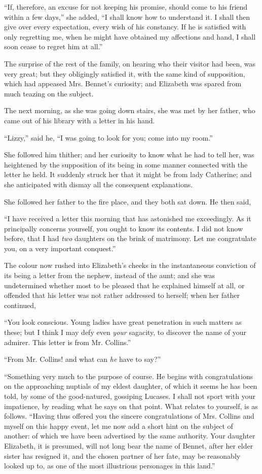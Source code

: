“If, therefore, an excuse for not keeping his promise,
should come to his friend within a few days,” she added,
“I shall know how to understand it. I shall then give
over every expectation, every wish of his constancy. If
he is satisfied with only regretting me, when he might
have obtained my affections and hand, I shall soon cease
to regret him at all.”

\strut

The surprise of the rest of the family, on hearing who
their visitor had been, was very great; but they obligingly
satisfied it, with the same kind of supposition, which had
appeased Mrs. Bennet’s curiosity; and Elizabeth was
spared from much teazing on the subject.

The next morning, as she was going down stairs, she
was met by her father, who came out of his library with
a letter in his hand.

“Lizzy,” said he, “I was going to look for you; come
into my room.”

She followed him thither; and her curiosity to know
what he had to tell her, was heightened by the supposition
of its being in some manner connected with the letter he
held. It suddenly struck her that it might be from lady
Catherine; and she anticipated with dismay all the
consequent explanations.

She followed her father to the fire place, and they both
sat down. He then said,

“I have received a letter this morning that has astonished
me exceedingly. As it principally concerns yourself,
you ought to know its contents. I did not know before,
that I had \textit{two} daughters on the brink of matrimony. Let
me congratulate you, on a very important conquest.”

The colour now rushed into Elizabeth’s cheeks in the
instantaneous conviction of its being a letter from the
nephew, instead of the aunt; and she was undetermined
whether most to be pleased that he explained himself at
all, or offended that his letter was not rather addressed to
herself; when her father continued,

“You look conscious. Young ladies have great penetration
in such matters as these; but I think I may defy
even \textit{your} sagacity, to discover the name of your admirer.
This letter is from Mr. Collins.”

“From Mr. Collins! and what can \textit{he} have to say?”

“Something very much to the purpose of course. He
begins with congratulations on the approaching nuptials
of my eldest daughter, of which it seems he has been told,
by some of the good-natured, gossiping Lucases. I shall
not sport with your impatience, by reading what he says
on that point. What relates to yourself, is as follows.
“Having thus offered you the sincere congratulations of
Mrs. Collins and myself on this happy event, let me now
add a short hint on the subject of another: of which
we have been advertised by the same authority. Your
daughter Elizabeth, it is presumed, will not long bear the
name of Bennet, after her elder sister has resigned it,
and the chosen partner of her fate, may be reasonably
looked up to, as one of the most illustrious personages
in this land.”

